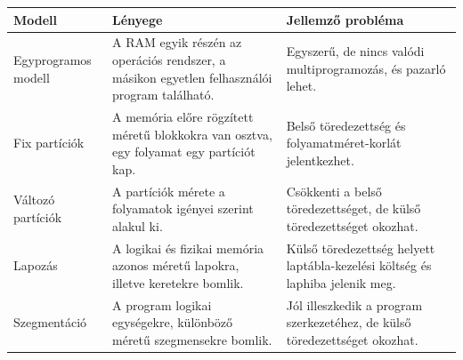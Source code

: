 \begin{tabularx}{\textwidth}{L{31mm}X X}
\toprule
\textbf{Modell} & \textbf{Lényege} & \textbf{Jellemző probléma} \\
\midrule
Egyprogramos modell & A RAM egyik részén az operációs rendszer, a másikon egyetlen felhasználói program található. & Egyszerű, de nincs valódi multiprogramozás, és pazarló lehet. \\
Fix partíciók & A memória előre rögzített méretű blokkokra van osztva, egy folyamat egy partíciót kap. & Belső töredezettség és folyamatméret-korlát jelentkezhet. \\
Változó partíciók & A partíciók mérete a folyamatok igényei szerint alakul ki. & Csökkenti a belső töredezettséget, de külső töredezettséget okozhat. \\
Lapozás & A logikai és fizikai memória azonos méretű lapokra, illetve keretekre bomlik. & Külső töredezettség helyett laptábla-kezelési költség és laphiba jelenik meg. \\
Szegmentáció & A program logikai egységekre, különböző méretű szegmensekre bomlik. & Jól illeszkedik a program szerkezetéhez, de külső töredezettséget okozhat. \\
\bottomrule
\end{tabularx}
